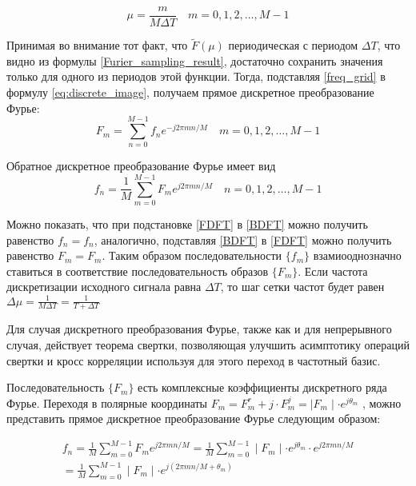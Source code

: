 \documentclass[oneside,final,14pt]{extreport}
\begin{document}
$$
\begin{equation}\mu=\frac{m}{M \Delta T} \quad m=0,1,2, \ldots, M-1 \label{freq_grid} \end{equation} 
$$

Принимая во внимание тот факт, что $\tilde{F}(\mu)$ периодическая с периодом $\Delta T$, что видно из формулы \ref{Furier_sampling_result}, достаточно сохранить значения только для одного из периодов этой функции. Тогда, подставляя \ref{freq_grid} в формулу \ref{eq:discrete_image},  получаем прямое дискретное преобразование Фурье:
\begin{equation}
F_{m}=\sum_{n=0}^{M - 1} f_{n} e^{-j 2 \pi m n / M} \quad m=0,1,2, \ldots, M-1
\label{FDFT}
\end{equation}

Обратное дискретное преобразование Фурье имеет вид
\begin{equation}
f_{n}=\frac{1}{M} \sum_{m=0}^{M-1} F_{m} e^{j 2 \pi m n / M} \quad n=0,1,2, \ldots, M - 1
\label{BDFT}
\end{equation}

Можно показать, что при подстановке \ref{FDFT} в \ref{BDFT} можно получить равенство $f_n = f_n$, аналогично, подставляя \ref{BDFT} в \ref{FDFT} можно получить равенство $F_m = F_m$. Таким образом последовательности $\{f_m\}$ взамиооднозначно ставиться в соответствие последовательность образов $\{F_m\}$.  Если частота дискретизации исходного сигнала равна $\Delta T$, то шаг сетки частот будет равен $\Delta \mu = \frac{1}{M \Delta T}   = \frac{1}{T + \Delta T}$ 

Для случая дискретного преобразования Фурье, также как и для непрерывного случая, действует теорема свертки\cite{bib:bio_signals_and_image_proc}, позволяющая улучшить асимптотику операций свертки и кросс корреляции используя для этого переход в частотный базис.

 Последовательность $\{F_m\}$ есть комплексные коэффициенты дискретного ряда Фурье. Переходя в полярные координаты $F_m = F^r_m + j \cdot F^j_m = \mid F_m \mid \cdot e^{j \theta_m}$ , можно представить прямое дискретное преобразование Фурье следующим образом: 

$$
\begin{equation}
\begin{aligned}
f_{n}=\frac{1}{M} \sum_{m=0}^{M-1} F_{m} e^{j 2 \pi m n / M} 
=
\frac{1}{M} \sum_{m=0}^{M-1} \mid F_m \mid \cdot e^{j \theta_m} \cdot  e^{j 2 \pi m n / M}  
\\=
\frac{1}{M} \sum_{m=0}^{M-1} \mid F_m \mid  \cdot  e^{j( 2 \pi m n / M + \theta_m)} \quad
\end{aligned}
\end{equation}
$$
\end{document}
